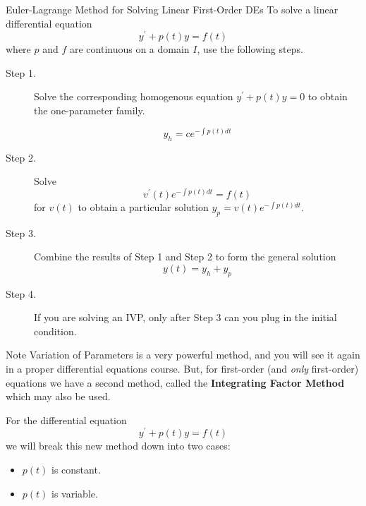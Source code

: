 \documentclass{beamer}
\begin{document}
\begin{frame}
\begin{block}{Euler-Lagrange Method for Solving Linear First-Order DEs}
To solve a linear differential equation
\begin{equation*}
y^\prime + p(t) y = f(t)
\end{equation*}
where $p$ and $f$ are continuous on a domain $I$, use the following steps.
\begin{description}
\item[Step 1.] Solve the corresponding homogenous equation $y^\prime+p(t)y=0$ to obtain the one-parameter family.

\vspace{-3mm}
\begin{equation*}
y_h=c e^{-\int p(t) dt}
\end{equation*}\vspace{-8mm}
\item[Step 2.] Solve
\begin{equation*}
v^\prime(t) e^{-\int p(t)dt} = f(t)
\end{equation*}
for $v(t)$ to obtain a particular solution $y_p = v(t) e^{-\int p(t)dt}$.
\item[Step 3.] Combine the results of Step 1 and Step 2 to form the general solution
\begin{equation*}
y(t)=y_h + y_p
\end{equation*}
\item[Step 4.] If you are solving an IVP, only after Step 3 can you plug in the initial condition.
\end{description}
\end{block}
\end{frame}

\begin{frame}
\begin{block}{Note}
Variation of Parameters is a very powerful method, and you will see it again in a proper differential equations course. But, for first-order (and \emph{only} first-order) equations we have a second method, called the \textbf{Integrating Factor Method} which may also be used. \pause

\vspace{2mm}
For the differential equation
\begin{equation*}
y^\prime + p(t) y = f(t)
\end{equation*}
we will break this new method down into two cases:
\begin{itemize}
\item $p(t)$ is constant.
\item $p(t)$ is variable.
\end{itemize}
\end{block}
\end{frame}
\end{document}
